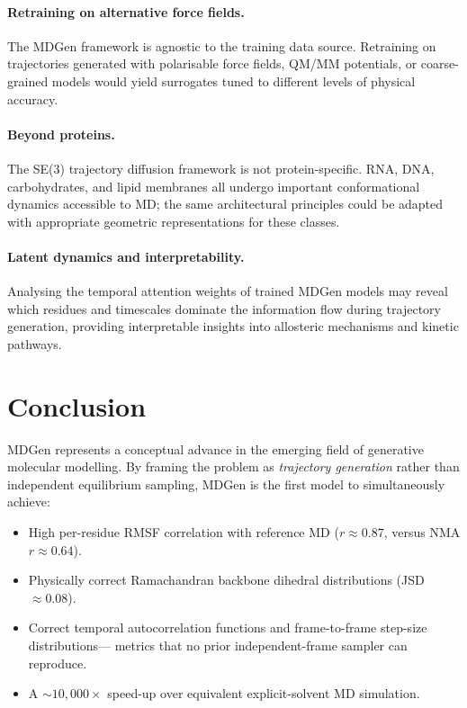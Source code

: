 \documentclass[11pt,a4paper]{article}
\begin{document}
\paragraph{Retraining on alternative force fields.}
The MDGen framework is agnostic to the training data source.  Retraining on trajectories generated
with polarisable force fields, QM/MM potentials, or coarse-grained models would yield surrogates
tuned to different levels of physical accuracy.

\paragraph{Beyond proteins.}
The SE(3) trajectory diffusion framework is not protein-specific.  RNA, DNA, carbohydrates, and
lipid membranes all undergo important conformational dynamics accessible to MD; the same
architectural principles could be adapted with appropriate geometric representations for these
classes.

\paragraph{Latent dynamics and interpretability.}
Analysing the temporal attention weights of trained MDGen models may reveal which residues and
timescales dominate the information flow during trajectory generation, providing interpretable
insights into allosteric mechanisms and kinetic pathways.


\section{Conclusion}

MDGen represents a conceptual advance in the emerging field of generative molecular modelling.
By framing the problem as \emph{trajectory generation} rather than independent equilibrium
sampling, MDGen is the first model to simultaneously achieve:
\begin{itemize}[leftmargin=2em]
  \item High per-residue RMSF correlation with reference MD ($r \approx 0.87$, versus NMA $r
    \approx 0.64$).
  \item Physically correct Ramachandran backbone dihedral distributions (JSD $\approx 0.08$).
  \item Correct temporal autocorrelation functions and frame-to-frame step-size distributions---
    metrics that no prior independent-frame sampler can reproduce.
  \item A $\sim 10{,}000\times$ speed-up over equivalent explicit-solvent MD simulation.
\end{itemize}
\end{document}
